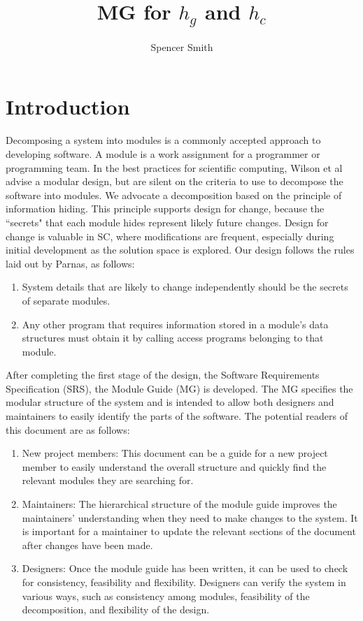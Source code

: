 \documentclass[12pt]{article}
\title{MG for $h_{g}$ and $h_{c}$}
\author{Spencer Smith}
\begin{document}
\maketitle
\tableofcontents
\newpage
\section{Introduction}
\label{Sec:I}
Decomposing a system into modules is a commonly accepted approach to developing software.  A module is a work assignment for a programmer or programming team. In the best practices for scientific computing, Wilson et al advise a modular design, but are silent on the criteria to use to decompose the software into modules.  We advocate a decomposition based on the principle of information hiding. This principle supports design for change, because the ``secrets" that each module hides represent likely future changes.  Design for change is valuable in SC, where modifications are frequent, especially during initial development as the solution space is explored.
Our design follows the rules laid out by Parnas, as follows:
\begin{enumerate}
\item{System details that are likely to change independently should be the secrets of separate modules.}
\item{Any other program that requires information stored in a module's data structures must obtain it by calling access programs belonging to that module.}
\end{enumerate}
After completing the first stage of the design, the Software Requirements Specification (SRS), the Module Guide (MG) is developed. The MG specifies the modular structure of the system and is intended to allow both designers and maintainers to easily identify the parts of the software.  The potential readers of this document are as follows:
\begin{enumerate}
\item{New project members: This document can be a guide for a new project member to easily understand the overall structure and quickly find the relevant modules they are searching for.}
\item{Maintainers: The hierarchical structure of the module guide improves the maintainers' understanding when they need to make changes to the system. It is important for a maintainer to update the relevant sections of the document after changes have been made.}
\item{Designers: Once the module guide has been written, it can be used to check for consistency, feasibility and flexibility. Designers can verify the system in various ways, such as consistency among modules, feasibility of the decomposition, and flexibility of the design.}
\end{enumerate}
\end{document}
